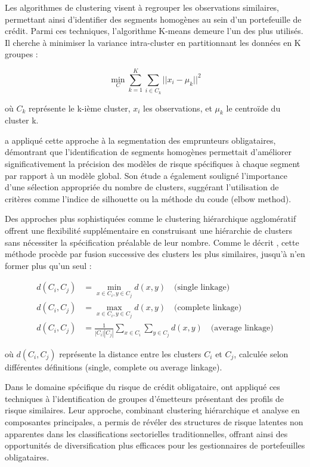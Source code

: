 Les algorithmes de clustering visent à regrouper les observations similaires, permettant ainsi d'identifier des segments homogènes au sein d'un portefeuille de crédit. Parmi ces techniques, l'algorithme K-means demeure l'un des plus utilisés. Il cherche à minimiser la variance intra-cluster en partitionnant les données en K groupes :

\begin{equation}
\min_{C} \sum_{k=1}^K \sum_{i \in C_k} ||x_i - \mu_k||^2
\end{equation}

où $C_k$ représente le k-ième cluster, $x_i$ les observations, et $\mu_k$ le centroïde du cluster k.

\citet{harris2015} a appliqué cette approche à la segmentation des emprunteurs obligataires, démontrant que l'identification de segments homogènes permettait d'améliorer significativement la précision des modèles de risque spécifiques à chaque segment par rapport à un modèle global. Son étude a également souligné l'importance d'une sélection appropriée du nombre de clusters, suggérant l'utilisation de critères comme l'indice de silhouette ou la méthode du coude (elbow method).

Des approches plus sophistiquées comme le clustering hiérarchique agglomératif offrent une flexibilité supplémentaire en construisant une hiérarchie de clusters sans nécessiter la spécification préalable de leur nombre. Comme le décrit \citet{aggarwal2014}, cette méthode procède par fusion successive des clusters les plus similaires, jusqu'à n'en former plus qu'un seul :

\begin{align}
d(C_i, C_j) &= \min_{x \in C_i, y \in C_j} d(x, y) \quad \text{(single linkage)}\\
d(C_i, C_j) &= \max_{x \in C_i, y \in C_j} d(x, y) \quad \text{(complete linkage)}\\
d(C_i, C_j) &= \frac{1}{|C_i||C_j|} \sum_{x \in C_i} \sum_{y \in C_j} d(x, y) \quad \text{(average linkage)}
\end{align}

où $d(C_i, C_j)$ représente la distance entre les clusters $C_i$ et $C_j$, calculée selon différentes définitions (single, complete ou average linkage).

Dans le domaine spécifique du risque de crédit obligataire, \citet{poon2019} ont appliqué ces techniques à l'identification de groupes d'émetteurs présentant des profils de risque similaires. Leur approche, combinant clustering hiérarchique et analyse en composantes principales, a permis de révéler des structures de risque latentes non apparentes dans les classifications sectorielles traditionnelles, offrant ainsi des opportunités de diversification plus efficaces pour les gestionnaires de portefeuilles obligataires.

